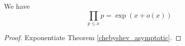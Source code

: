 \begin{corollary}
\label{primorial_bounds}
\leanok
We have
    $$ \prod_{p \leq x} p = \exp( x + o(x) )$$
\end{corollary}
\begin{proof}
\leanok
Exponentiate Theorem \ref{chebyshev_asymptotic}.
\end{proof}
